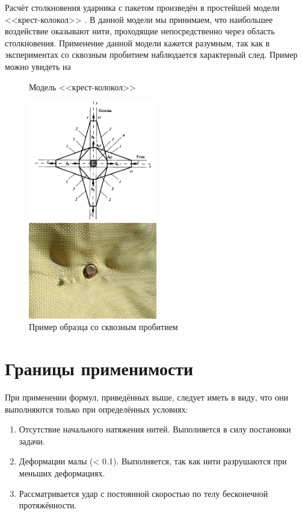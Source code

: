 Расчёт столкновения ударника с пакетом произведён в простейшей модели <<крест-колокол>>\cite{kharchenko} .
В данной модели мы принимаем, что наибольшее воздействие оказывают нити, проходящие непосредственно через область столкновения.
Применение данной модели кажется разумным, так как в экспериментах со сквозным пробитием наблюдается характерный след.
Пример можно увидеть на 

\begin{figure}[H]
    \centering

    \caption{Модель <<крест-колокол>>}
    \label{fig:bell-cross}
    \includegraphics[width=0.5\textwidth]{img/bell_cross_model.png}

    \caption{Пример образца со сквозным пробитием}
    \label{fig:bell-cross-example}
    \includegraphics[width=0.5\textwidth]{img/bell_cross_example.png}
\end{figure}

\section{Границы применимости}\label{sec:eq-application}
При применении формул, приведённых выше, следует иметь в виду, что они выполняются только при определённых условиях:

\begin{enumerate}
    \item Отсутствие начального натяжения нитей.
Выполняется в силу постановки задачи.
    \item Деформации малы (< 0.1).
Выполняется, так как нити разрушаются при меньших деформациях.
    \item Рассматривается удар с постоянной скоростью по телу бесконечной протяжённости.
\end{enumerate}

